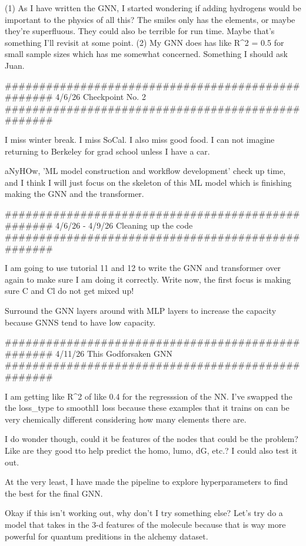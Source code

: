     (1) As I have written the GNN, I started wondering if adding hydrogens would be important to the physics of all this? The smiles only has the elements, or maybe they're superfluous.
        They could also be terrible for run time. Maybe that's something I'll revisit at some point. 
    (2) My GNN does has like R^2 = 0.5 for small sample sizes which has me somewhat concerned. Something I should ask Juan. 

##################################################
4/6/26 Checkpoint No. 2
##################################################

I miss winter break. I miss SoCal. I also miss good food. I can not imagine returning to Berkeley for grad school unless I have a car.

aNyHOw, 'ML model construction and workflow development' check up time, and I think I will just focus on the skeleton of this ML model which is finishing making the GNN
and the transformer.

##################################################
4/6/26 - 4/9/26 Cleaning up the code
##################################################

I am going to use tutorial 11 and 12 to write the GNN and transformer over again to make sure I am doing it correctly. 
Write now, the first focus is making sure C and Cl do not get mixed up!

Surround the GNN layers around with MLP layers to increase the capacity because GNNS tend to have low capacity. 

##################################################
4/11/26 This Godforsaken GNN
##################################################

I am getting like R^2 of like 0.4 for the regresssion of the NN. I've swapped the the loss_type
to smoothl1 loss because these examples that it trains on can be very chemically different considering how many elements
there are.

I do wonder though, could it be features of the nodes that could be the problem? Like are they good tto help predict the homo, lumo, 
dG, etc.? I could also test it out. 

At the very least, I have made the pipeline to explore hyperparameters to find the best for the final GNN. 

Okay if this isn't working out, why don't I try something else? Let's try do a model that takes in the 3-d features 
of the molecule because that is way more powerful for quantum preditions in the alchemy dataset.

